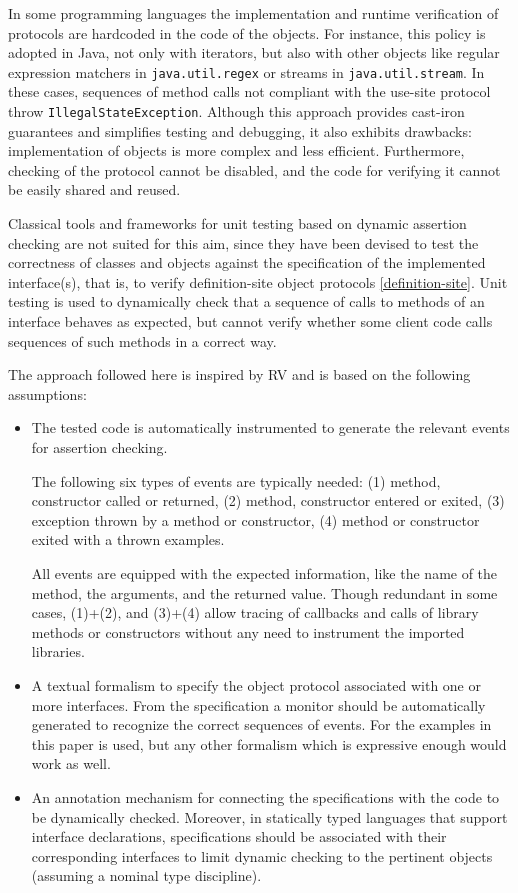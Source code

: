 In some programming languages the implementation and runtime verification of protocols are hardcoded in the code of the objects. For instance, this policy is adopted in Java, not only with iterators, but also with other objects like regular expression matchers in \lstinline|java.util.regex| or streams in \lstinline|java.util.stream|. In these cases, sequences of method calls not compliant with the use-site protocol throw \lstinline|IllegalStateException|.
Although this approach provides cast-iron guarantees and simplifies testing and debugging, it also exhibits drawbacks: implementation of objects is more  complex and less efficient. Furthermore, checking of the protocol cannot be disabled, and the code for verifying it cannot be easily shared and reused.

Classical tools and frameworks for unit testing based on dynamic assertion checking \cite{LangrHT15,FardM17} are not suited for this aim, since they have been devised to test the correctness of classes and objects against the specification of the implemented interface(s), that is, to verify definition-site object protocols \cref{definition-site}. Unit testing is used to dynamically check that a sequence of calls to methods of an interface behaves as expected, but cannot verify whether some client code calls sequences of such methods in a correct way.

The approach followed here is inspired by RV and is based on the following assumptions:
\begin{itemize}
 \item The tested code is automatically instrumented to generate the relevant events for assertion checking.

       The following six types of events are typically needed: (1) method, constructor called or returned, (2) method, constructor entered or exited, (3) exception thrown by a method or constructor, (4) method or constructor exited with a thrown examples.

       All events are equipped with the expected information, like the name of the method, the arguments, and the returned value. Though redundant in some cases, (1)+(2), and (3)+(4) allow tracing of callbacks and calls of library methods or constructors without any need to instrument the imported libraries.
 \item A textual formalism to specify the object protocol associated with one or more interfaces. From the specification a monitor should be automatically generated to recognize the correct sequences of events. For the examples in this paper \rml is used, but any other formalism which is expressive enough would work as well.
 \item An annotation mechanism for connecting the specifications with the code to be dynamically checked. Moreover, in statically typed languages that support interface declarations, specifications should be associated with their corresponding interfaces to limit dynamic checking to the pertinent objects (assuming a nominal type discipline).
\end{itemize}

